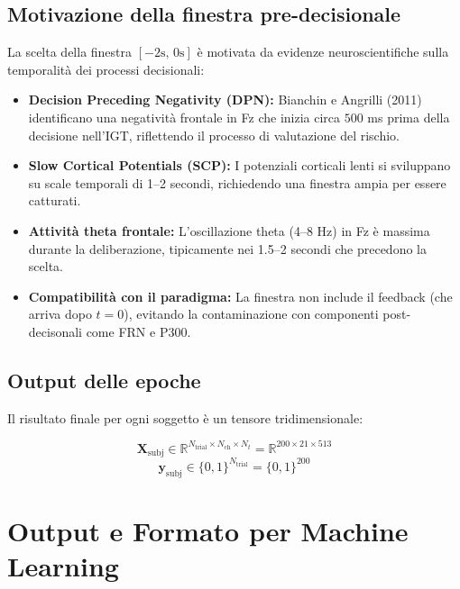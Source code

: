 \documentclass[12pt, a4paper]{article}
\begin{document}
\subsection{Motivazione della finestra pre-decisionale}

La scelta della finestra $[-2\text{s},\, 0\text{s}]$ è motivata da evidenze neuroscientifiche sulla temporalità dei processi decisionali:

\begin{itemize}
    \item \textbf{Decision Preceding Negativity (DPN):} Bianchin e Angrilli (2011) identificano una negatività frontale in Fz che inizia circa $500$ ms prima della decisione nell'IGT, riflettendo il processo di valutazione del rischio.
    \item \textbf{Slow Cortical Potentials (SCP):} I potenziali corticali lenti si sviluppano su scale temporali di 1--2 secondi, richiedendo una finestra ampia per essere catturati.
    \item \textbf{Attività theta frontale:} L'oscillazione theta (4--8 Hz) in Fz è massima durante la deliberazione, tipicamente nei 1.5--2 secondi che precedono la scelta.
    \item \textbf{Compatibilità con il paradigma:} La finestra non include il feedback (che arriva dopo $t=0$), evitando la contaminazione con componenti post-decisonali come FRN e P300.
\end{itemize}

\subsection{Output delle epoche}

Il risultato finale per ogni soggetto è un tensore tridimensionale:

\begin{formulabox}
\[
\mathbf{X}_\text{subj} \in \mathbb{R}^{N_\text{trial} \times N_\text{ch} \times N_t} = \mathbb{R}^{200 \times 21 \times 513}
\]
\[
\mathbf{y}_\text{subj} \in \{0,1\}^{N_\text{trial}} = \{0,1\}^{200}
\]
\end{formulabox}

\section{Output e Formato per Machine Learning}
\end{document}
